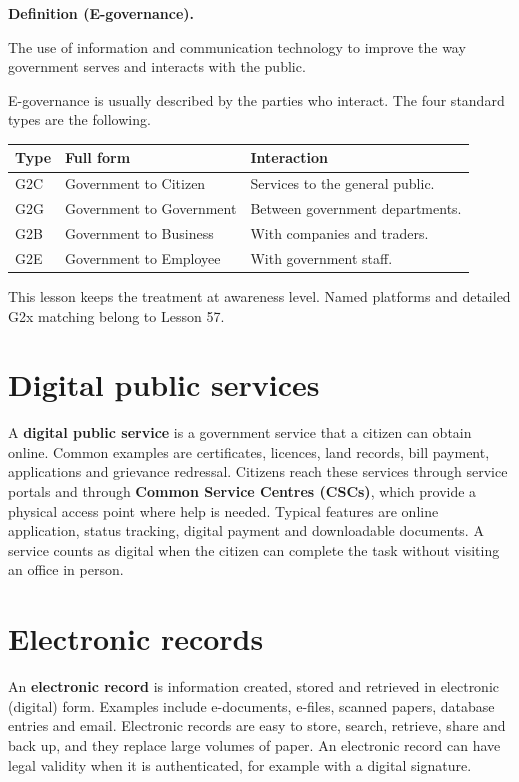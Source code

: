 \documentclass[11pt]{article}
\newenvironment{definitionbox}[1]{%
  \par\noindent\textbf{Definition (#1).}\ \itshape
}{\par\vspace{0.3em}}
\begin{document}
\begin{definitionbox}{E-governance}
The use of information and communication technology to improve the way
government serves and interacts with the public.
\end{definitionbox}

E-governance is usually described by the parties who interact. The four
standard types are the following.

\begin{center}
\begin{tabular}{p{}p{}p{}}
\toprule
\textbf{Type} & \textbf{Full form} & \textbf{Interaction} \\
\midrule
G2C & Government to Citizen & Services to the general public. \\
G2G & Government to Government & Between government departments. \\
G2B & Government to Business & With companies and traders. \\
G2E & Government to Employee & With government staff. \\
\bottomrule
\end{tabular}
\end{center}

This lesson keeps the treatment at awareness level. Named platforms and
detailed G2x matching belong to Lesson 57.

\section{Digital public services}
A \textbf{digital public service} is a government service that a citizen can
obtain online. Common examples are certificates, licences, land records, bill
payment, applications and grievance redressal. Citizens reach these services
through service portals and through \textbf{Common Service Centres (CSCs)},
which provide a physical access point where help is needed. Typical features
are online application, status tracking, digital payment and downloadable
documents. A service counts as digital when the citizen can complete the task
without visiting an office in person.

\section{Electronic records}
An \textbf{electronic record} is information created, stored and retrieved in
electronic (digital) form. Examples include e-documents, e-files, scanned
papers, database entries and email. Electronic records are easy to store,
search, retrieve, share and back up, and they replace large volumes of paper.
An electronic record can have legal validity when it is authenticated, for
example with a digital signature.
\end{document}
